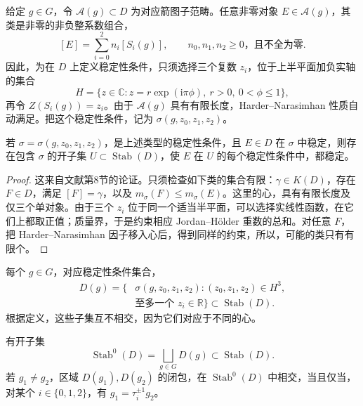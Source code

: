 给定 $g\in G$，令 $\mathcal{A}(g)\subset D$ 为对应箭图子范畴。任意非零对象 $E\in\mathcal{A}(g)$，其类是非零的非负整系数组合，
\[
[E]=\sum_{i=0}^2n_i[S_i(g)],\qquad
n_0,n_1,n_2\ge0\text{，且不全为零}.
\]
因此，为在 $D$ 上定义稳定性条件，只须选择三个复数 $z_i$，位于上半平面加负实轴的集合
\[
H=\{z\in\mathbb{C}:z=r\exp(\mathrm{i}\pi\phi),\ r>0,\ 0<\phi\le1\},
\]
再令 $Z(S_i(g))=z_i$。由于 $\mathcal{A}(g)$ 具有有限长度，Harder--Narasimhan 性质自动满足。把这个稳定性条件，记为 $\sigma(g,z_0,z_1,z_2)$。
\begin{lemma}\label{lem:5.45}
若 $\sigma=\sigma(g,z_0,z_1,z_2)$，是上述类型的稳定性条件，且 $E\in D$ 在 $\sigma$ 中稳定，则存在包含 $\sigma$ 的开子集 $U\subset\operatorname{Stab}(D)$，使 $E$ 在 $U$ 的每个稳定性条件中，都稳定。
\end{lemma}

\begin{proof}
这来自文献第8节的论证。只须检查如下类的集合有限：$\gamma\in K(D)$，存在 $F\in D$，满足 $[F]=\gamma$，以及 $m_\sigma(F)\le m_\sigma(E)$。这里的心，具有有限长度及仅三个单对象。由于三个 $z_i$ 位于同一个适当半平面，可以选择实线性函数，在它们上都取正值；质量界，于是约束相应 Jordan--H\"older 重数的总和。对任意 $F$，把 Harder--Narasimhan 因子移入心后，得到同样的约束，所以，可能的类只有有限个。
\end{proof}

每个 $g\in G$，对应稳定性条件集合，
\[
\begin{aligned}
D(g)=\{&\sigma(g,z_0,z_1,z_2):(z_0,z_1,z_2)\in H^3,\\
&\text{至多一个 }z_i\in\mathbb{R}\}\subset\operatorname{Stab}(D).
\end{aligned}
\]
根据定义，这些子集互不相交，因为它们对应于不同的心。
\begin{proposition}\label{prop:5.46}
有开子集
\[
\operatorname{Stab}^0(D)=\bigsqcup_{g\in G}D(g)\subset\operatorname{Stab}(D).
\]
若 $g_1\ne g_2$，区域 $D(g_1),D(g_2)$ 的闭包，在 $\operatorname{Stab}^0(D)$ 中相交，当且仅当，对某个 $i\in\{0,1,2\}$，有 $g_1=\tau_i^{\pm1}g_2$。
\end{proposition}

